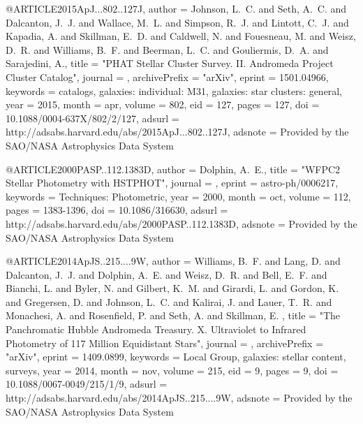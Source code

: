 @ARTICLE{2015ApJ...802..127J,
   author = {{Johnson}, L.~C. and {Seth}, A.~C. and {Dalcanton}, J.~J. and 
	{Wallace}, M.~L. and {Simpson}, R.~J. and {Lintott}, C.~J. and 
	{Kapadia}, A. and {Skillman}, E.~D. and {Caldwell}, N. and {Fouesneau}, M. and 
	{Weisz}, D.~R. and {Williams}, B.~F. and {Beerman}, L.~C. and 
	{Gouliermis}, D.~A. and {Sarajedini}, A.},
    title = "{PHAT Stellar Cluster Survey. II. Andromeda Project Cluster Catalog}",
  journal = {\apj},
archivePrefix = "arXiv",
   eprint = {1501.04966},
 keywords = {catalogs, galaxies: individual: M31, galaxies: star clusters: general},
     year = 2015,
    month = apr,
   volume = 802,
      eid = {127},
    pages = {127},
      doi = {10.1088/0004-637X/802/2/127},
   adsurl = {http://adsabs.harvard.edu/abs/2015ApJ...802..127J},
  adsnote = {Provided by the SAO/NASA Astrophysics Data System}
}

@ARTICLE{2000PASP..112.1383D,
   author = {{Dolphin}, A.~E.},
    title = "{WFPC2 Stellar Photometry with HSTPHOT}",
  journal = {\pasp},
   eprint = {astro-ph/0006217},
 keywords = {Techniques: Photometric},
     year = 2000,
    month = oct,
   volume = 112,
    pages = {1383-1396},
      doi = {10.1086/316630},
   adsurl = {http://adsabs.harvard.edu/abs/2000PASP..112.1383D},
  adsnote = {Provided by the SAO/NASA Astrophysics Data System}
}

@ARTICLE{2014ApJS..215....9W,
   author = {{Williams}, B.~F. and {Lang}, D. and {Dalcanton}, J.~J. and 
	{Dolphin}, A.~E. and {Weisz}, D.~R. and {Bell}, E.~F. and {Bianchi}, L. and 
	{Byler}, N. and {Gilbert}, K.~M. and {Girardi}, L. and {Gordon}, K. and 
	{Gregersen}, D. and {Johnson}, L.~C. and {Kalirai}, J. and {Lauer}, T.~R. and 
	{Monachesi}, A. and {Rosenfield}, P. and {Seth}, A. and {Skillman}, E.
	},
    title = "{The Panchromatic Hubble Andromeda Treasury. X. Ultraviolet to Infrared Photometry of 117 Million Equidistant Stars}",
  journal = {\apjs},
archivePrefix = "arXiv",
   eprint = {1409.0899},
 keywords = {Local Group, galaxies: stellar content, surveys},
     year = 2014,
    month = nov,
   volume = 215,
      eid = {9},
    pages = {9},
      doi = {10.1088/0067-0049/215/1/9},
   adsurl = {http://adsabs.harvard.edu/abs/2014ApJS..215....9W},
  adsnote = {Provided by the SAO/NASA Astrophysics Data System}
}

